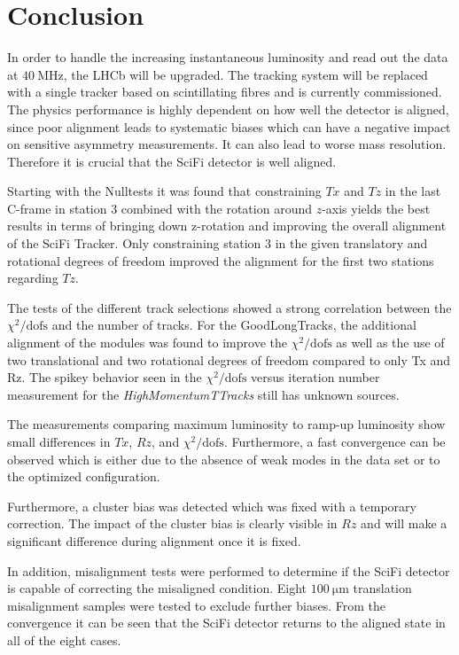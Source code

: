 \chapter{Conclusion}

In order to handle the increasing instantaneous luminosity and read out the data at $\SI{40}{\mega\hertz}$, the LHCb will be upgraded.
The tracking system will be replaced with a single tracker based on scintillating fibres and is currently commissioned. The physics performance is
highly dependent on how well the detector is aligned, since poor alignment leads to systematic biases which can have a negative impact on sensitive asymmetry measurements. It can also lead to worse mass resolution. Therefore it is crucial that the SciFi detector is well aligned.

Starting with the Nulltests it was found that constraining $Tx$ and $Tz$ in the last C-frame in station 3 combined with the rotation around $z$-axis yields the best results in terms of bringing down z-rotation and improving the overall alignment of the SciFi Tracker.
Only constraining station 3 in the given translatory and rotational degrees of freedom improved the alignment for the first two stations regarding $Tz$.

The tests of the different track selections showed a strong correlation between the $\chi^2 / \text{dofs}$ and the number of tracks.
For the GoodLongTracks, the additional alignment of the modules was found to improve the $\chi^2 / \text{dofs}$ as well as the use of two translational and two rotational degrees of freedom compared to only Tx and Rz.
The spikey behavior seen in the $\chi^2 / \text{dofs}$ versus iteration number measurement for the \textit{HighMomentumTTracks} still has unknown sources.

The measurements comparing maximum luminosity to ramp-up luminosity show small differences in $Tx$, $Rz$, and $\chi^2 / \text{dofs}$. Furthermore, a fast convergence can be observed which is either due to the absence of weak modes in the data set or to the optimized configuration.

Furthermore, a cluster bias was detected which was fixed with a temporary correction. The impact of the cluster bias is clearly visible in $Rz$ and will make a significant difference during alignment once it is fixed.

In addition, misalignment tests were performed to determine if the SciFi detector is capable of correcting the misaligned condition. Eight $\SI{100}{\micro\metre}$ translation misalignment samples were tested to exclude further biases. From the convergence it can be seen that the SciFi detector returns to the aligned state in all of the eight cases.

